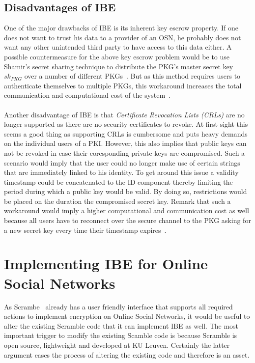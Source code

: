 \documentclass[journal]{IEEEtran}
\begin{document}
\subsection{Disadvantages of IBE}\label{sec:possible-workarounds}
One of the major drawbacks of IBE is its inherent key escrow property. If one
does not want to trust his data to a provider of an OSN, he probably does
not want any other unintended third party to have access to this data either. A
possible countermeasure for the above key escrow problem would be to use
Shamir's secret sharing technique to distribute the PKG's master secret key
$sk_{PKG}$ over a number of different PKGs~\cite{BonehFranklinIBE}. But as this
method requires users to authenticate themselves to multiple PKGs, this
workaround increases the total communication and computational cost of the
system~\cite{Baek04asurvey}.\\
\\
Another disadvantage of IBE is that \textit{Certificate Revocation Lists (CRLs)}
are no longer supported as there are no security certificates to revoke. At
first sight this seems a good thing as supporting CRLs is cumbersome and puts
heavy demands on the individual users of a PKI. However, this also implies that
public keys can not be revoked in case their coresponding private keys are
compromised. Such a scenario would imply that the user could no longer make use
of certain strings that are immediately linked to his identity. To get around
this issue a validity timestamp could be concatenated to the ID component
thereby limiting the period during which a public key would be valid. By doing
so, restrictions would be placed on the duration the compromised
secret key. Remark that such a workaround would imply a
higher computational and communication cost as well because all users have to
reconnect over the secure channel to the PKG asking for a new secret key every
time their timestamp expires~\cite{YoungbloodIntroduction}.

\section{Implementing IBE for Online Social
Networks}\label{sec:implementing-IBE-for-OSNs}
As Scrambe~\cite{BeatoScramble} already has a user friendly interface that
supports all required actions to implement encryption on Online Social Networks,
it would be useful to alter the existing Scramble code that it can implement
IBE as well. The most important trigger to modify the existing Scamble code is
because Scramble is open source, lightweight and developed at KU Leuven.
Certainly the latter argument eases the process of altering the existing code
and therefore is an asset.
\end{document}
